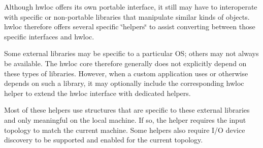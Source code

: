 Although hwloc offers its own portable interface, it still may have to interoperate with specific or non-\/portable libraries that manipulate similar kinds of objects. hwloc therefore offers several specific \char`\"{}helpers\char`\"{} to assist converting between those specific interfaces and hwloc.

Some external libraries may be specific to a particular OS; others may not always be available. The hwloc core therefore generally does not explicitly depend on these types of libraries. However, when a custom application uses or otherwise depends on such a library, it may optionally include the corresponding hwloc helper to extend the hwloc interface with dedicated helpers.

Most of these helpers use structures that are specific to these external libraries and only meaningful on the local machine. If so, the helper requires the input topology to match the current machine. Some helpers also require I/O device discovery to be supported and enabled for the current topology.


